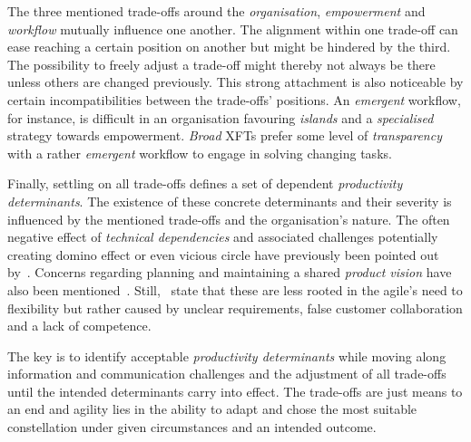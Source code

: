The three mentioned trade-offs around the \emph{organisation}, \emph{empowerment} and \emph{workflow} mutually influence one another. The alignment within one trade-off can ease reaching a certain position on another but might be hindered by the third. The possibility to freely adjust a trade-off might thereby not always be there unless others are changed previously. This strong attachment is also noticeable by certain incompatibilities between the trade-offs' positions. An \emph{emergent} workflow, for instance, is difficult in an organisation favouring \emph{islands} and a \emph{specialised} strategy towards empowerment. \emph{Broad} \acp{XFT} prefer some level of \emph{transparency} with a rather \emph{emergent} workflow to engage in solving changing tasks. 

Finally, settling on all trade-offs defines a set of dependent \emph{productivity determinants}. The existence of these concrete determinants and their severity is influenced by the mentioned trade-offs and the organisation's nature. The often negative effect of \emph{technical dependencies} and associated challenges potentially creating domino effect or even vicious circle have previously been pointed out by~\citet{nelson2013technicaldependencies}. Concerns regarding planning and maintaining a shared \emph{product vision} have also been mentioned~\citep{badampudi2013proddelay}. Still,~\citet{badampudi2013proddelay} state that these are less rooted in the agile's need to flexibility but rather caused by unclear requirements, false customer collaboration and a lack of competence. 

The key is to identify acceptable \emph{productivity determinants} while moving along information and communication challenges and the adjustment of all trade-offs until the intended determinants carry into effect. The trade-offs are just means to an end and agility lies in the ability to adapt and chose the most suitable constellation under given circumstances and an intended outcome.